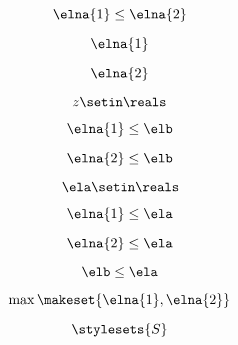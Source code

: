 \begin{forslides}
    \begin{equation}
        \label{eq:systems-133}
        \elna{1}\leq \elna{2}
    \end{equation}

    \begin{equation}
        \label{eq:systems-134}
        \elna{1}
    \end{equation}

    \begin{equation}
        \label{eq:systems-135}
        \elna{2}
    \end{equation}

    \begin{equation}
        \label{eq:systems-136}
        z\setin \reals
    \end{equation}

    \begin{equation}
        \label{eq:systems-137}
        \elna{1}\leq \elb
    \end{equation}

    \begin{equation}
        \label{eq:systems-138}
        \elna{2}\leq \elb
    \end{equation}

    \begin{equation}
        \label{eq:systems-139}
        \ela\setin \reals
    \end{equation}

    \begin{equation}
        \label{eq:systems-140}
        \elna{1}\leq \ela
    \end{equation}

    \begin{equation}
        \label{eq:systems-141}
        \elna{2}\leq \ela
    \end{equation}

    \begin{equation}
        \label{eq:systems-142}
        \elb\leq \ela
    \end{equation}

    \begin{equation}
        \label{eq:systems-143}
        \max\makeset{\elna{1},\elna{2}}
    \end{equation}

    \begin{equation}
        \label{eq:systems-144}
        \stylesets{S}
    \end{equation}


\end{forslides}
